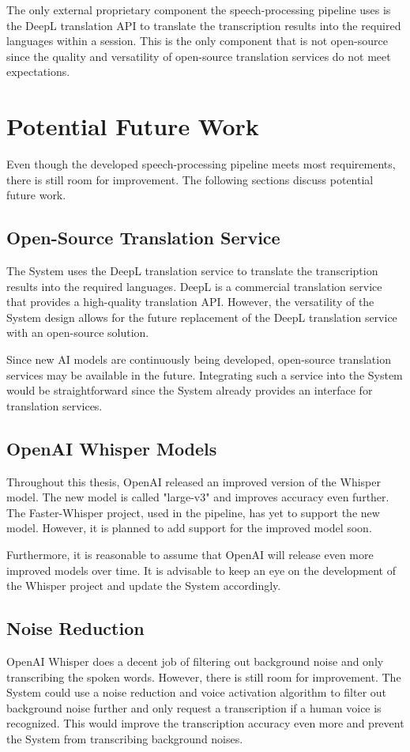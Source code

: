The only external proprietary component the speech-processing pipeline uses is the DeepL translation API to translate 
the transcription results into the required languages within a session. This is the only component that is not 
open-source since the quality and versatility of open-source translation services do not meet expectations.


\section{Potential Future Work}
Even though the developed speech-processing pipeline meets most requirements, there is still room for improvement. 
The following sections discuss potential future work.

\subsection{Open-Source Translation Service}

The System uses the DeepL translation service to translate the transcription results into the required languages. 
DeepL is a commercial translation service that provides a high-quality translation API. However, the versatility of the 
System design allows for the future replacement of the DeepL translation service with an open-source solution. 

Since new AI models are continuously being developed, open-source translation services may be available in the future. 
Integrating such a service into the System would be straightforward since the System already provides an interface for 
translation services.

\subsection{OpenAI Whisper Models}

Throughout this thesis, OpenAI released an improved version of the Whisper model. The new model is called "large-v3" 
and improves accuracy even further. The Faster-Whisper project, used in the pipeline, has yet to support the new model. 
However, it is planned to add support for the improved model soon.

Furthermore, it is reasonable to assume that OpenAI will release even more improved models over time. It is advisable 
to keep an eye on the development of the Whisper project and update the System accordingly.

\subsection{Noise Reduction}

OpenAI Whisper does a decent job of filtering out background noise and only transcribing the spoken words. However, 
there is still room for improvement. The System could use a noise reduction and voice activation algorithm to filter 
out background noise further and only request a transcription if a human voice is recognized. This would improve the 
transcription accuracy even more and prevent the System from transcribing background noises.
